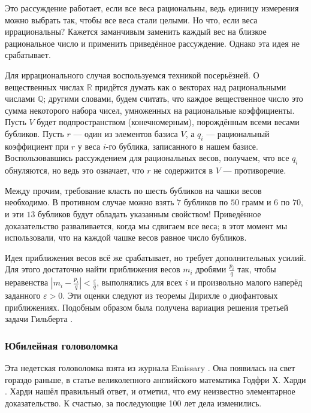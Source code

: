 Это рассуждение работает, если все веса рациональны, ведь единицу измерения можно выбрать так, чтобы все веса стали целыми.
Но что, если веса иррациональны?
Кажется заманчивым заменить каждый вес на близкое рациональное число и применить приведённое рассуждение.
Однако эта идея не срабатывает.

Для иррационального случая воспользуемся техникой посерьёзней.
О вещественных числах $\mathbb{R}$ придётся думать как о векторах над рациональными числами $\mathbb{Q}$;
другими словами, будем считать, что каждое вещественное число это сумма некоторого набора чисел, умноженных на рациональные коэффициенты.
Пусть $V$ будет подпространством (конечномерным), порождённым всеми весами бубликов.
Пусть $r$ --- один из элементов базиса $V$, а $q_i$ --- рациональный коэффициент при $r$ у веса $i$-го бублика, записанного в нашем базисе.
Воспользовавшись рассуждением для рациональных весов, получаем, что все $q_i$ обнуляются, но ведь это означает, что $r$ не содержится в $V$ --- противоречие.

Между прочим, требование класть по шесть бубликов на чашки весов необходимо.
В противном случае можно взять $7$ бубликов по $50$ грамм и $6$ по $70$, и эти $13$ бубликов будут обладать указанным свойством!
Приведённое доказательство разваливается, когда мы сдвигаем все веса;
в этот момент мы использовали, что на каждой чашке весов равное число бубликов.

\begin{addedbytheeditors}
Идея приближения весов всё же срабатывает, но требует дополнительных усилий.
Для этого достаточно найти приближения весов $m_i$ дробями $\tfrac{p_i}q$ так, чтобы неравенства
$|m_i-\tfrac{p_i}q|<\tfrac\varepsilon q$,
выполнялись для всех $i$ и произвольно малого наперёд заданного $\varepsilon>0$.
Эти оценки следуют из теоремы Дирихле о диофантовых приближениях.
Подобным образом была получена вариация решения третьей задачи Гильберта \cite{benko}.\pr
\end{addedbytheeditors}


\subsubsection*{Юбилейная головоломка}

Эта недетская головоломка взята из журнала Emissary \cite[Осень 2004]{3}.
Она появилась на свет гораздо раньше, в статье великолепного английского математика Годфри Х. Харди \cite{37}. 
Харди нашёл правильный ответ, и отметил, что ему неизвестно элементарное доказательство.
К счастью, за последующие 100 лет дела изменились.

